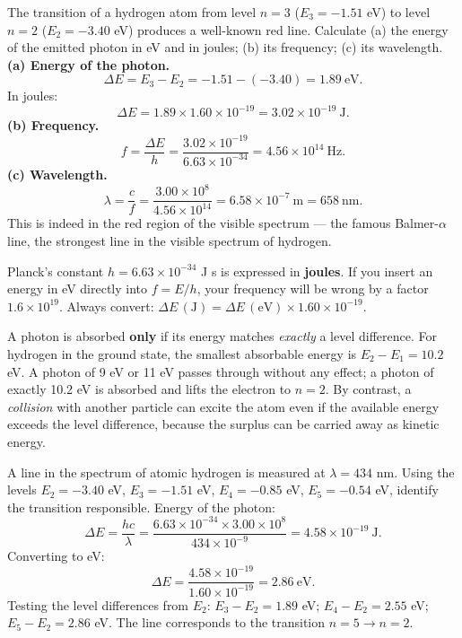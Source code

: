 \documentclass[11pt]{article}
\begin{document}
\begin{exoresolu}
The transition of a hydrogen atom from level $n=3$ ($E_3 = -1.51$ eV) to level $n=2$ ($E_2 = -3.40$ eV) produces a well-known red line. Calculate (a) the energy of the emitted photon in eV and in joules; (b) its frequency; (c) its wavelength.
\tcblower
\textbf{(a) Energy of the photon.}
\[
\Delta E = E_3 - E_2 = -1.51 - (-3.40) = 1.89\ \text{eV}.
\]
In joules:
\[
\Delta E = 1.89 \times 1.60\times 10^{-19} = 3.02\times 10^{-19}\ \text{J}.
\]
\textbf{(b) Frequency.}
\[
f = \frac{\Delta E}{h} = \frac{3.02\times 10^{-19}}{6.63\times 10^{-34}} = 4.56\times 10^{14}\ \text{Hz}.
\]
\textbf{(c) Wavelength.}
\[
\lambda = \frac{c}{f} = \frac{3.00\times 10^{8}}{4.56\times 10^{14}} = 6.58\times 10^{-7}\ \text{m} = 658\ \text{nm}.
\]
This is indeed in the red region of the visible spectrum — the famous Balmer-$\alpha$ line, the strongest line in the visible spectrum of hydrogen.
\end{exoresolu}

\begin{attention}[Convert eV to joules before using $E = hf$]
Planck's constant $h = 6.63\times 10^{-34}$ J s is expressed in \textbf{joules}. If you insert an energy in eV directly into $f = E/h$, your frequency will be wrong by a factor $1.6\times 10^{19}$. Always convert: $\Delta E\,(\text{J}) = \Delta E\,(\text{eV}) \times 1.60\times 10^{-19}$.
\end{attention}

\begin{attention}
A photon is absorbed \textbf{only} if its energy matches \emph{exactly} a level difference. For hydrogen in the ground state, the smallest absorbable energy is $E_2 - E_1 = 10.2$ eV. A photon of 9 eV or 11 eV passes through without any effect; a photon of exactly 10.2 eV is absorbed and lifts the electron to $n=2$. By contrast, a \emph{collision} with another particle can excite the atom even if the available energy exceeds the level difference, because the surplus can be carried away as kinetic energy.
\end{attention}

\begin{exoresolu}
A line in the spectrum of atomic hydrogen is measured at $\lambda = 434$ nm. Using the levels $E_2 = -3.40$ eV, $E_3 = -1.51$ eV, $E_4 = -0.85$ eV, $E_5 = -0.54$ eV, identify the transition responsible.
\tcblower
Energy of the photon:
\[
\Delta E = \frac{hc}{\lambda} = \frac{6.63\times 10^{-34}\times 3.00\times 10^{8}}{434\times 10^{-9}} = 4.58\times 10^{-19}\ \text{J}.
\]
Converting to eV:
\[
\Delta E = \frac{4.58\times 10^{-19}}{1.60\times 10^{-19}} = 2.86\ \text{eV}.
\]
Testing the level differences from $E_2$: $E_3 - E_2 = 1.89$ eV; $E_4 - E_2 = 2.55$ eV; $E_5 - E_2 = 2.86$ eV. The line corresponds to the transition $n=5 \rightarrow n=2$.
\end{exoresolu}
\end{document}
